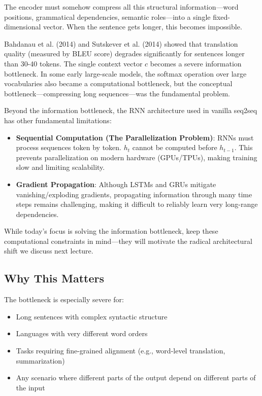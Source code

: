 \documentclass{article}
\begin{document}
The encoder must somehow compress all this structural information---word positions, grammatical dependencies, semantic roles---into a single fixed-dimensional vector. When the sentence gets longer, this becomes impossible.

\begin{tcolorbox}[colback=red!5!white, colframe=red!50!black, title=The Empirical Evidence]
Bahdanau et al. (2014) and Sutskever et al. (2014) showed that translation quality (measured by BLEU score) degrades significantly for sentences longer than 30-40 tokens. The single context vector $c$ becomes a severe information bottleneck. In some early large-scale models, the softmax operation over large vocabularies also became a computational bottleneck, but the conceptual bottleneck---compressing long sequences---was the fundamental problem.
\end{tcolorbox}

\begin{tcolorbox}[colback=orange!5!white, colframe=orange!75!black, title=Backlog: Costs of Recurrence]
Beyond the information bottleneck, the RNN architecture used in vanilla seq2seq has other fundamental limitations:
\begin{itemize}
    \item \textbf{Sequential Computation (The Parallelization Problem)}: RNNs must process sequences token by token. $h_t$ cannot be computed before $h_{t-1}$. This prevents parallelization on modern hardware (GPUs/TPUs), making training slow and limiting scalability.
    \item \textbf{Gradient Propagation}: Although LSTMs and GRUs mitigate vanishing/exploding gradients, propagating information through many time steps remains challenging, making it difficult to reliably learn very long-range dependencies.
\end{itemize}
While today's focus is solving the information bottleneck, keep these computational constraints in mind---they will motivate the radical architectural shift we discuss next lecture.
\end{tcolorbox}

\subsection{Why This Matters}

The bottleneck is especially severe for:
\begin{itemize}
    \item Long sentences with complex syntactic structure
    \item Languages with very different word orders
    \item Tasks requiring fine-grained alignment (e.g., word-level translation, summarization)
    \item Any scenario where different parts of the output depend on different parts of the input
\end{itemize}
\end{document}
